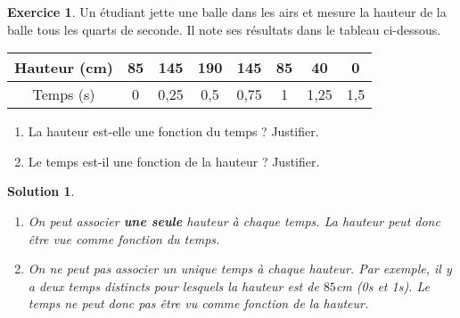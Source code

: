 \documentclass[a4paper, 14pt]{extarticle}
\theoremstyle{plain}
\newtheorem*{sol}{Solution}
\theoremstyle{definition}
\newtheorem{ex}{Exercice}
\newif\ifsolutions
\newcommand{\exe}[2]{
		\begin{ex} #1  \end{ex}
		\begin{sol} #2 \end{sol}
	}
\newcommand{\exe}[2]{
		\begin{ex} #1  \end{ex}
	}
\begin{document}
\pagestyle{fancy}
\fancyhead[C]{\textbf{Fonctions 1\ifsolutions -- Solutions  \fi}}
\fancyhead[R]{\today}

\exe{
	Un étudiant jette une balle dans les airs et mesure la hauteur de la balle tous les quarts de seconde.
	Il note ses résultats dans le tableau ci-dessous.
	\begin{center}
		\begin{tabular}{|c|c|c|c|c|c|c|c|}\hline
			Hauteur (cm) & 85 & 145 & 190 & 145 & 85 & 40 & 0 \\ \hline
			Temps (s) & 0 & 0,25 & 0,5 & 0,75 & 1 & 1,25 & 1,5 \\\hline
		\end{tabular}
	\end{center}
	
	\begin{enumerate}
		\item La hauteur est-elle une fonction du temps ? Justifier.
		\item Le temps est-il une fonction de la hauteur ? Justifier.
	\end{enumerate}
}{
	\begin{enumerate}
		\item On peut associer \textbf{une seule} hauteur à chaque temps. La hauteur peut donc être vue comme fonction du temps.
		\item On ne peut pas associer un unique temps à chaque hauteur. Par exemple, il y a deux temps distincts pour lesquels la hauteur est de $85$cm (0s et 1s).
		Le temps ne peut donc pas être vu comme fonction de la hauteur.
	\end{enumerate}
}
	
\end{document}
